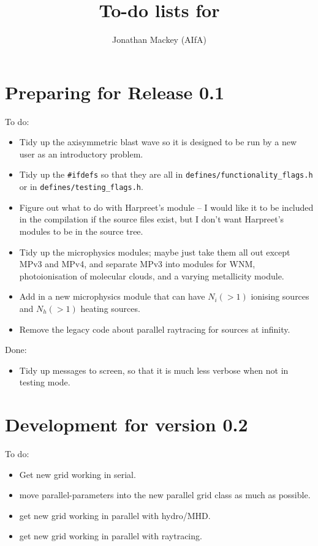 \documentclass[a4paper,11pt]{article}
\title{To-do lists for \pion{}}
\author{Jonathan Mackey (AIfA)}
\begin{document}
\maketitle

\section{Preparing for Release 0.1}
To do:
\begin{itemize}
\item Tidy up the axisymmetric blast wave so it is designed to be run by a new user as an introductory problem.
\item Tidy up the \texttt{\#ifdefs} so that they are all in \verb|defines/functionality_flags.h| or in \verb|defines/testing_flags.h|.
\item Figure out what to do with Harpreet's module -- I would like it to be included in the compilation if the source files exist, but I don't want Harpreet's modules to be in the source tree.
\item Tidy up the microphysics modules; maybe just take them all out except MPv3 and MPv4, and separate MPv3 into modules for WNM, photoionisation of molecular clouds, and a varying metallicity module.
\item Add in a new microphysics module that can have $N_i(>1)$ ionising sources and $N_h(>1)$ heating sources.
\item Remove the legacy code about parallel raytracing for sources at infinity.
\end{itemize}

Done:
\begin{itemize}
\item Tidy up messages to screen, so that it is much less verbose when not in testing mode.
\end{itemize}

\section{Development for version 0.2}
To do:
\begin{itemize}
\item Get new grid working in serial.
\item move parallel-parameters into the new parallel grid class as much as possible.
\item get new grid working in parallel with hydro/MHD.
\item get new grid working in parallel with raytracing.
\end{itemize}



\end{document}
